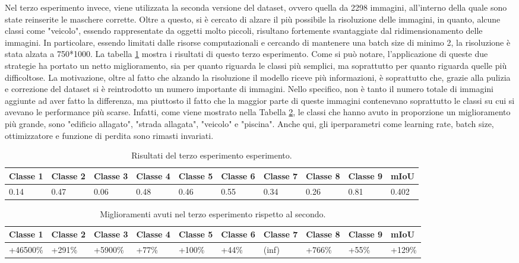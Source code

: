 Nel terzo esperimento invece, viene utilizzata la seconda versione del dataset, ovvero quella da 2298 immagini, all'interno della quale sono state reinserite le maschere corrette. Oltre a questo, si è cercato di alzare il più possibile la risoluzione delle immagini, in quanto, alcune classi come "veicolo", essendo rappresentate da oggetti molto piccoli, risultano fortemente svantaggiate dal ridimensionamento delle immagini. In particolare, essendo limitati dalle risorse computazionali e cercando di mantenere una batch size di minimo 2, la risoluzione è stata alzata a 750*1000. La tabella \ref{table:config8_mIoU} mostra i risultati di questo terzo esperimento. Come si può notare, l'applicazione di queste due strategie ha portato un netto miglioramento, sia per quanto riguarda le classi più semplici, ma soprattutto per quanto riguarda quelle più difficoltose. La motivazione, oltre al fatto che alzando la risoluzione il modello riceve più informazioni, è soprattutto che, grazie alla pulizia e correzione del dataset si è reintrodotto un numero importante di immagini. Nello specifico, non è tanto il numero totale di immagini aggiunte ad aver fatto la differenza, ma piuttosto il fatto che la maggior parte di queste immagini contenevano soprattutto le classi su cui si avevano le performance più scarse. Infatti, come viene mostrato nella Tabella \ref{table:config8_vs_config5}, le classi che hanno avuto in proporzione un miglioramento più grande, sono "edificio allagato", "strada allagata", "veicolo" e "piscina". Anche qui, gli iperparametri come learning rate, batch size, ottimizzatore e funzione di perdita sono rimasti invariati.

\begin{table}[h!]
\hspace{-0.1in}
\begin{tabular}{||p{1cm} p{1cm} p{1cm} p{1cm} p{1cm} p{1cm} p{1cm} p{1cm} p{1cm} | p{1cm}||}
 \hline
    Classe 1 & Classe 2 & Classe 3 & Classe 4 & Classe 5 & Classe 6 & Classe 7 & Classe 8 & Classe 9 & mIoU \\ [0.5ex]
 \hline
0.14 & 0.47 & 0.06 & 0.48 &  0.46 & 0.55 & 0.34 & 0.26 & 0.81 & 0.402 \\ [1ex] 
 \hline
\end{tabular}
\caption{Risultati del terzo esperimento esperimento.}
\label{table:config8_mIoU}
\end{table}

\begin{table}[h!]
\hspace{-0.3in}
\begin{tabular}{||p{1.5cm} p{1cm} p{1.5cm} p{1cm} p{1cm} p{1cm} p{1cm} p{1cm} p{1cm} | p{1.2cm}||}
 \hline
    Classe 1 & Classe 2 & Classe 3 & Classe 4 & Classe 5 & Classe 6 & Classe 7 & Classe 8 & Classe 9 & mIoU \\ [0.5ex]
 \hline
+46500\% & +291\% & +5900\% & +77\% & +100\% & +44\% & (inf) & +766\% & +55\% & +129\% \\ [1ex] 
 \hline
\end{tabular}
\caption{Miglioramenti avuti nel terzo esperimento rispetto al secondo.}
\label{table:config8_vs_config5}
\end{table}




